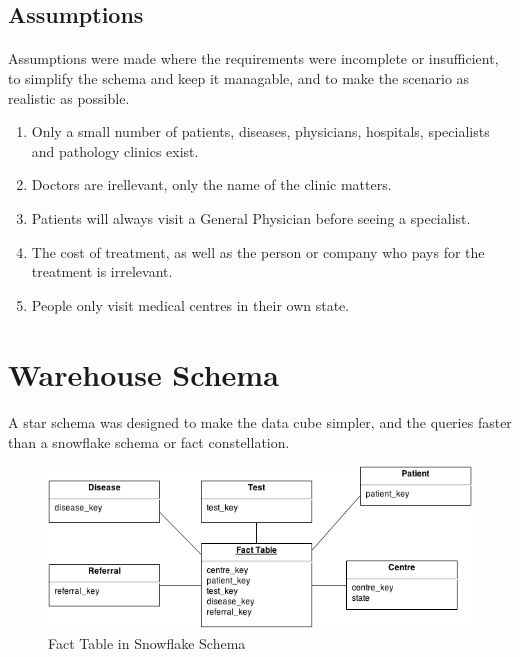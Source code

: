 \documentclass[a4paper,12pt,openbib]{article}
\begin{document}
\subsection*{Assumptions}
\paragraph{}
Assumptions were made where the requirements were incomplete or insufficient, to simplify the schema and keep it managable, and to make the scenario as realistic as possible.
\begin{enumerate}
	\item Only a small number of patients, diseases, physicians, hospitals, specialists and pathology clinics exist.
	\item Doctors are irellevant, only the name of the clinic matters.
	\item Patients will always visit a General Physician before seeing a specialist.
	\item The cost of treatment, as well as the person or company who pays for the treatment is irrelevant.
	\item People only visit medical centres in their own state.
\end{enumerate}

\section*{Warehouse Schema}
\paragraph{}
A star schema was designed to make the data cube simpler, and the queries faster than a snowflake schema or fact constellation.
\begin{figure}[ht!]
	\centering
	\includegraphics[width=15cm]{schema}
	\caption{Fact Table in Snowflake Schema}
	\label{fig:schema}
\end{figure}
\end{document}
